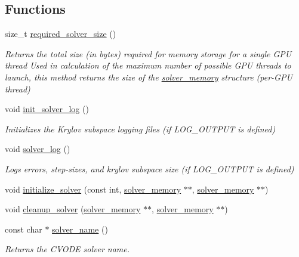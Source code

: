\subsection*{Functions}
\begin{DoxyCompactItemize}
\item 
size\+\_\+t \hyperlink{solver__init_8cuh_ab75ba2ae0b04dfd786322e7b34f49d84}{required\+\_\+solver\+\_\+size} ()
\begin{DoxyCompactList}\small\item\em Returns the total size (in bytes) required for memory storage for a single G\+PU thread Used in calculation of the maximum number of possible G\+PU threads to launch, this method returns the size of the \hyperlink{structsolver__memory}{solver\+\_\+memory} structure (per-\/\+G\+PU thread) \end{DoxyCompactList}\item 
void \hyperlink{solver__init_8cuh_a39c825543042903f579cd9c35a279dca}{init\+\_\+solver\+\_\+log} ()
\begin{DoxyCompactList}\small\item\em Initializes the Krylov subspace logging files (if L\+O\+G\+\_\+\+O\+U\+T\+P\+UT is defined) \end{DoxyCompactList}\item 
void \hyperlink{solver__init_8cuh_ae95cbe81062a829668c5fa8e28b2e2c7}{solver\+\_\+log} ()
\begin{DoxyCompactList}\small\item\em Logs errors, step-\/sizes, and krylov subspace size (if L\+O\+G\+\_\+\+O\+U\+T\+P\+UT is defined) \end{DoxyCompactList}\item 
void \hyperlink{solver__init_8cuh_acb4d6fc5363c1df648e3eb91ab5004c3}{initialize\+\_\+solver} (const int, \hyperlink{structsolver__memory}{solver\+\_\+memory} $\ast$$\ast$, \hyperlink{structsolver__memory}{solver\+\_\+memory} $\ast$$\ast$)
\item 
void \hyperlink{solver__init_8cuh_afb4079e8c474059834591935c1639cc4}{cleanup\+\_\+solver} (\hyperlink{structsolver__memory}{solver\+\_\+memory} $\ast$$\ast$, \hyperlink{structsolver__memory}{solver\+\_\+memory} $\ast$$\ast$)
\item 
const char $\ast$ \hyperlink{solver__init_8cuh_abd0fcd691c85e2469a3c89438c174f2b}{solver\+\_\+name} ()
\begin{DoxyCompactList}\small\item\em Returns the C\+V\+O\+DE solver name. \end{DoxyCompactList}\end{DoxyCompactItemize}


